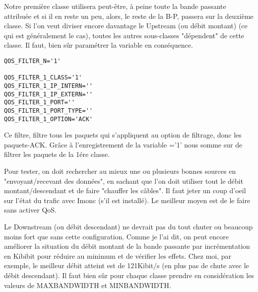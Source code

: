     Notre première classe utilisera peut-être, à peine toute la bande
    passante attribuée et si il en reste un peu, alors, le reste de la
    B-P, passera sur la deuxième classe. Si l'on veut diviser encore
    davantage le Upstream (ou débit montant) (ce qui est généralement
    le cas), toutes les autres sous-classes "dépendent" de cette classe.
    Il faut, bien sûr paramétrer la variable 
    en conséquence.

\begin{small}
\begin{example}
\begin{verbatim}
QOS_FILTER_N='1'

QOS_FILTER_1_CLASS='1'
QOS_FILTER_1_IP_INTERN=''
QOS_FILTER_1_IP_EXTERN=''
QOS_FILTER_1_PORT=''
QOS_FILTER_1_PORT_TYPE=''
QOS_FILTER_1_OPTION='ACK'
\end{verbatim}
\end{example}
\end{small}

    Ce filtre, filtre tous les paquets qui s'appliquent au option de filtrage,
    donc les paquets-ACK. Grâce à l'enregistrement de la variable ='1'
    nous somme sur de filtrer les paquets de la 1ére classe.

    Pour tester, on doit rechercher au mieux une ou plusieurs bonnes
    sources en "envoyant/recevant des données", en sachant que l'on
    doit utiliser tout le débit montant/descendant et de faire "chauffer
    les câbles". Il faut jeter un coup d'oeil sur l'état du trafic avec
    Imonc (s'il est installé). Le meilleur moyen est de le faire sans activer QoS.

    Le Downstream (ou débit descendant) ne devrait pas du tout chuter
    ou beaucoup moins fort que sans cette configuration. Comme je l'ai dit,
    on peut encore améliorer la situation du débit montant de la bande passante
    par incrémentation en Kibibit pour réduire au minimum et de vérifier les
    effets. Chez moi, par exemple, le meilleur débit atteint est de 121Kibit/s
    (en plus pas de chute avec le débit descendant). Il faut bien sûr pour chaque
    classe prendre en considération les valeurs de MAXBANDWIDTH et MINBANDWIDTH.
